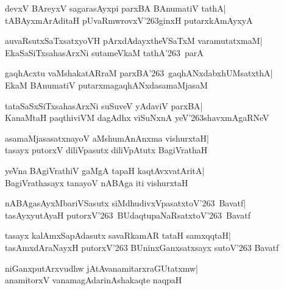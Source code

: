 \documentclass[twoside,12pt,openright]{book}
\newcounter{shloka}[chapter]
\begin{document}
\begin{shloka}%
devxV BAreyxV sagarasAyxpi parxBA BAnumatiV tathA|\\
tABAyxmArAditaH pUvaRmwrovxV\char'263ginxH putarxkAmAyxyA 
\end{shloka}

\begin{shloka}%
auvaRsutxSaTxsatxyoVH pArxdAdayxtheVSaTxM varamutatxmaM|\\
EkaSaSiTxsahasArxNi sutameVkaM tathA\char'263\ parA
\end{shloka}

\begin{shloka}%
gaqhAcxtu vaMshakatARraM parxBA\char'263\ gaqhANxdabxhUMsatxthA|\\
EkaM BAnumatiV putarxmagaqhANxdasamaMjasaM
\end{shloka}

\begin{shloka}%
tataSaSxSiTxsahasArxNi suSuveV yAdaviV parxBA|\\
KanaMtaH paqthiviVM dagAdhx viSuNxnA yeV\char'263shavxmAgaRNeV
\end{shloka}

\begin{shloka}%
asamaMjasasatxnayoV aMshumAnAnxma vishurxtaH|\\
tasayx putorxV diliVpasutx diliVpAtutx BagiVrathaH
\end{shloka}

\begin{shloka}%
yeVna BAgiVrathiV gaMgA tapaH kaqtAvxvatAritA|\\
BagiVrathasayx tanayoV nABAga iti vishurxtaH
\end{shloka}

\begin{shloka}%
nABAgasAyxMbariVSasutx siMdhudivxVpasatxtoV\char'263\ Bavatf|\\
tasAyxyutAyaH putorxV\char'263\ BUdaqtupaNaRsatxtoV\char'263\ Bavatf
\end{shloka}

\begin{shloka}%
tasayx kalAmxSapAdasutx savaRkamAR tataH samxqqtaH|\\
tasAmxdAraNayxH putorxV\char'263 BUninxGanxsatxsayx sutoV\char'263 Bavatf 
\end{shloka}

\begin{shloka}%
niGanxputArxvudhw jAtAvanamitarxraGUtatxmw|\\
anamitorxV vanamagAdarinAshakaqte naqpaH
\end{shloka}
\end{document}
